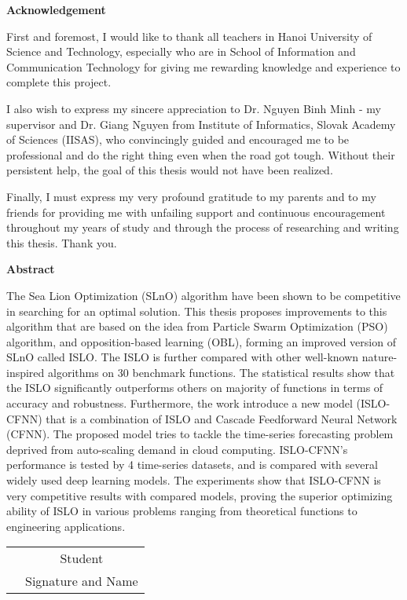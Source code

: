 \documentclass[../main.tex]{subfiles}
\begin{document}
\begin{center}
    \textbf{Acknowledgement}\\
\end{center}
First and foremost, I would like to thank all teachers in Hanoi University of Science and Technology, especially who are in School of Information and Communication Technology for giving me rewarding knowledge and experience to complete this project.

 I also wish to express my sincere appreciation to Dr. Nguyen Binh Minh - my supervisor and Dr. Giang Nguyen from Institute of Informatics, Slovak Academy of Sciences (IISAS), who convincingly guided and encouraged me to be professional and do the right thing even when the road got tough. Without their persistent help, the goal of this thesis would not have been realized.

Finally, I must express my very profound gratitude to my parents and to my friends for providing me with unfailing support and continuous encouragement throughout my years of study and through the process of researching and writing this thesis. Thank you. 
\begin{center}
    \textbf{Abstract}\\
\end{center}
The Sea Lion Optimization (SLnO) algorithm have been shown to be competitive in searching for an optimal solution. This thesis proposes improvements to this algorithm that are based on the idea from Particle Swarm Optimization (PSO) algorithm, and opposition-based learning (OBL), forming an improved version of SLnO called ISLO. The ISLO is further compared with other well-known nature-inspired algorithms on 30 benchmark functions. The statistical results show that the ISLO significantly outperforms others on majority of functions in terms of accuracy and robustness. Furthermore, the work introduce a new model (ISLO-CFNN) that is a combination of ISLO and Cascade Feedforward Neural Network (CFNN). The proposed model tries to tackle the time-series forecasting problem deprived from auto-scaling demand in cloud computing. ISLO-CFNN's performance is tested by 4 time-series datasets, and is compared with several widely used deep learning models. The experiments show that ISLO-CFNN is very competitive results with compared models, proving the superior optimizing ability of ISLO in various problems ranging from theoretical functions to engineering applications.

\begin{table}[H]
\centering
\begin{tabular}{p{5cm} c}
\multicolumn{1}{c}{\textbf{}} & Student \\
\textbf{}                     & \small{Signature and Name}
\end{tabular}
\end{table}
\end{document}
